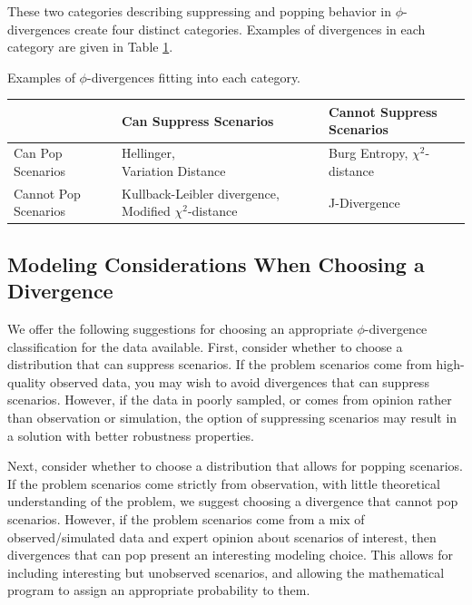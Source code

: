 \documentclass[ijoc,letterpaper]{informs3} %
\begin{document}
\noindent These two categories describing suppressing and popping behavior in $\phi$-divergences create four distinct categories.
Examples of divergences in each category are given in Table \ref{tb:phi_categories}.

\begin{table}
	\TABLE
	{
		Examples of $\phi$-divergences fitting into each category.
		\label{tb:phi_categories}
	}
	{\begin{tabular}{l|p{}p{}}
		 & Can Suppress Scenarios & Cannot Suppress Scenarios \\
		 \hline
		 Can Pop Scenarios %
			& \parbox{.33\textwidth}{Hellinger,\\Variation Distance} %
			& \parbox{.33\textwidth}{Burg Entropy,\\$\chi^2$-distance} \smallskip \\
		 Cannot Pop Scenarios %
			& \parbox{.33\textwidth}{Kullback-Leibler divergence,\\Modified $\chi^2$-distance} %
			& \parbox{.33\textwidth}{J-Divergence}
	\end{tabular}}
	{}
\end{table}

\subsection{Modeling Considerations When Choosing a Divergence}
\label{ssec:modeling}

We offer the following suggestions for choosing an appropriate $\phi$-divergence classification for the data available.
First, consider whether to choose a distribution that can suppress scenarios.
If the problem scenarios come from high-quality observed data, you may wish to avoid divergences that can suppress scenarios.
However, if the data in poorly sampled, or comes from opinion rather than observation or simulation, the option of suppressing scenarios may result in a solution with better robustness properties.

Next, consider whether to choose a distribution that allows for popping scenarios.
If the problem scenarios come strictly from observation, with little theoretical understanding of the problem, we suggest choosing a divergence that cannot pop scenarios.
However, if the problem scenarios come from a mix of observed/simulated data and expert opinion about scenarios of interest, then divergences that can pop present an interesting modeling choice.
This allows for including interesting but unobserved scenarios, and allowing the mathematical program to assign an appropriate probability to them.
\end{document}
